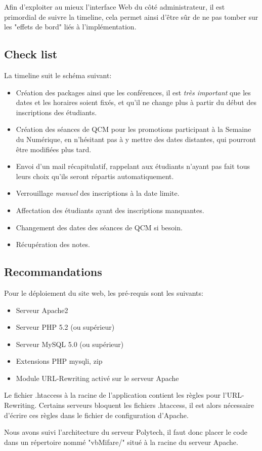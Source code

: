 Afin d'exploiter au mieux l'interface Web du côté administrateur, il est primordial
de suivre la timeline, cela permet ainsi d'être sûr de ne pas tomber sur les "effets de bord"
liés à l'implémentation.

        \subsection{Check list}

La timeline suit le schéma suivant:

    \begin{itemize}
    \item Création des packages ainsi que les conférences, il est \emph{très important} que
           les dates et les horaires soient fixés, et qu'il ne change plus à partir du début des
           inscriptions des étudiants.
    \item Création des séances de QCM pour les promotions participant à la Semaine du Numérique,
           en n'hésitant pas à y mettre des dates distantes, qui pourront être modifiées plus tard.
    \item Envoi d'un mail récapitulatif, rappelant aux étudiants n'ayant pas fait tous leurs choix
           qu'ils seront répartis automatiquement.
    \item Verrouillage \emph{manuel} des inscriptions à la date limite.
    \item Affectation des étudiants ayant des inscriptions manquantes.
    \item Changement des dates des séances de QCM si besoin.
    \item Récupération des notes.
    \end{itemize}

        \subsection{Recommandations}

Pour le déploiement du site web, les pré-requis sont les suivants:

    \begin{itemize}
    \item Serveur Apache2
    \item Serveur PHP 5.2 (ou supérieur)
    \item Serveur MySQL 5.0 (ou supérieur)
    \item Extensions PHP mysqli, zip
    \item Module URL-Rewriting activé sur le serveur Apache
    \end{itemize}

Le fichier .htaccess à la racine de l'application contient les règles pour
l'URL-Rewriting. Certains serveurs bloquent les fichiers .htaccess, il est alors
nécessaire d'écrire ces règles dans le fichier de configuration d'Apache.

Nous avons suivi l'architecture du serveur Polytech, il faut donc placer le code
dans un répertoire nommé "vbMifare/" situé à la racine du serveur Apache.
